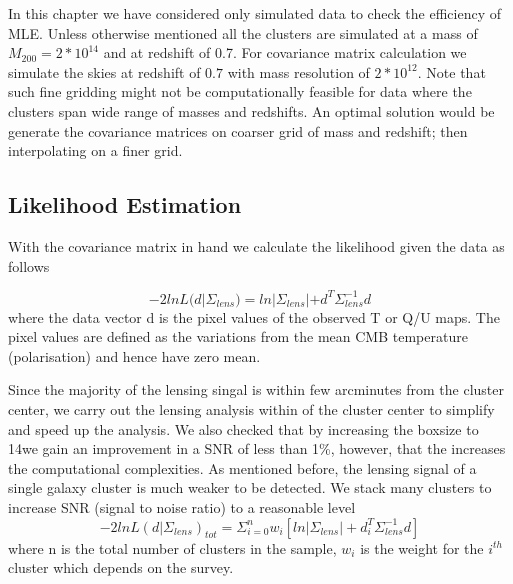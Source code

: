  In this chapter we have considered only simulated data to check the efficiency of MLE. 
 Unless otherwise mentioned all the clusters are simulated at a mass of $M_{200} = 2*10^{14}$\msolar {} and at redshift of 0.7.
 For covariance matrix calculation we simulate the skies at redshift of $0.7$ with mass resolution of $2*10^{12}$\msolar. 
 Note that such fine gridding might not be computationally feasible for data where the clusters span wide range of masses and redshifts.
 An optimal solution would be generate the covariance matrices on coarser grid of mass and redshift; then interpolating on a finer grid.
 
 
 
  
   
  
  \subsection{Likelihood Estimation}
  With the covariance matrix in hand we calculate the likelihood given the data as follows 
  
  \begin{equation}
  -2lnL(d|\Sigma_{lens}) = ln |\Sigma_{lens}| + d^{T} \Sigma^{-1}_{lens} d
  \end{equation}
  where the data vector d is the pixel values of the observed T or Q/U maps.
  The pixel values are defined as the variations from the mean CMB temperature (polarisation) and hence have zero mean.
  
  Since the majority of the lensing singal is within few arcminutes from the cluster center, we carry out the lensing analysis within \smallboxsize of the cluster center to simplify and speed up the analysis. 
  We also checked that by increasing the boxsize to 14\am we gain an improvement in a SNR of less than 1\%, however, that the increases the computational complexities. 
  As mentioned before, the lensing signal of a single galaxy cluster is much weaker to be detected. 
  We stack many clusters to increase SNR (signal to noise ratio) to a reasonable level
  \begin{equation}
  -2ln L(d| \Sigma_{lens})_{tot} = \Sigma^{n}_{i =0} w_{i} [ln |\Sigma_{lens}| + d^{T}_{i} \Sigma^{-1}_{lens}  d]
  \end{equation}
  where n is the total number of clusters in the sample, $w_{i}$ is the weight for the $i^{th}$ cluster which depends on the survey.

  
 